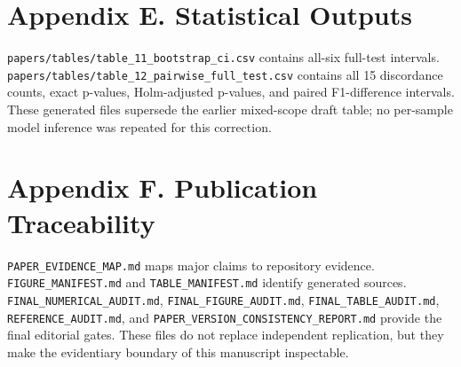 \documentclass[10pt,journal]{IEEEtran}
\begin{document}
\section{Appendix E. Statistical Outputs}
\texttt{papers/tables/table\_11\_bootstrap\_ci.csv} contains all-six full-test intervals. \texttt{papers/tables/table\_12\_pairwise\_full\_test.csv} contains all 15 discordance counts, exact p-values, Holm-adjusted p-values, and paired F1-difference intervals. These generated files supersede the earlier mixed-scope draft table; no per-sample model inference was repeated for this correction.

\section{Appendix F. Publication Traceability}
\texttt{PAPER\_EVIDENCE\_MAP.md} maps major claims to repository evidence. \texttt{FIGURE\_MANIFEST.md} and \texttt{TABLE\_MANIFEST.md} identify generated sources. \texttt{FINAL\_NUMERICAL\_AUDIT.md}, \texttt{FINAL\_FIGURE\_AUDIT.md}, \texttt{FINAL\_TABLE\_AUDIT.md}, \texttt{REFERENCE\_AUDIT.md}, and \texttt{PAPER\_VERSION\_CONSISTENCY\_REPORT.md} provide the final editorial gates. These files do not replace independent replication, but they make the evidentiary boundary of this manuscript inspectable.



\end{document}
